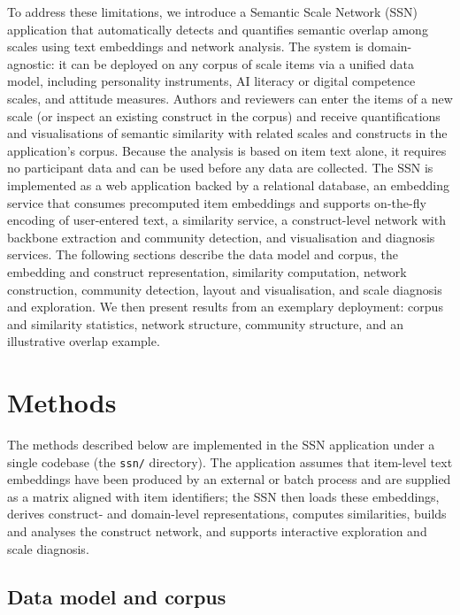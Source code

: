 \documentclass[11pt]{article}
\begin{document}
To address these limitations, we introduce a Semantic Scale Network (SSN) application that automatically detects and quantifies semantic overlap among scales using text embeddings and network analysis. The system is domain-agnostic: it can be deployed on any corpus of scale items via a unified data model, including personality instruments, AI literacy or digital competence scales, and attitude measures. Authors and reviewers can enter the items of a new scale (or inspect an existing construct in the corpus) and receive quantifications and visualisations of semantic similarity with related scales and constructs in the application's corpus. Because the analysis is based on item text alone, it requires no participant data and can be used before any data are collected. The SSN is implemented as a web application backed by a relational database, an embedding service that consumes precomputed item embeddings and supports on-the-fly encoding of user-entered text, a similarity service, a construct-level network with backbone extraction and community detection, and visualisation and diagnosis services. The following sections describe the data model and corpus, the embedding and construct representation, similarity computation, network construction, community detection, layout and visualisation, and scale diagnosis and exploration. We then present results from an exemplary deployment: corpus and similarity statistics, network structure, community structure, and an illustrative overlap example.

\section{Methods}

The methods described below are implemented in the SSN application under a single codebase (the \texttt{ssn/} directory). The application assumes that item-level text embeddings have been produced by an external or batch process and are supplied as a matrix aligned with item identifiers; the SSN then loads these embeddings, derives construct- and domain-level representations, computes similarities, builds and analyses the construct network, and supports interactive exploration and scale diagnosis.

\subsection{Data model and corpus}
\end{document}
